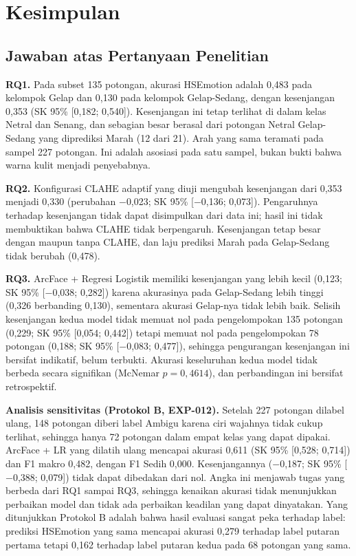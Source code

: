 \chapter{Kesimpulan}
\label{chap:conclusion}

\section{Jawaban atas Pertanyaan Penelitian}

\textbf{RQ1.} Pada subset 135 potongan, akurasi HSEmotion adalah 0,483 pada kelompok Gelap dan 0,130 pada kelompok Gelap-Sedang, dengan kesenjangan 0,353 (SK 95\% [0,182; 0,540]). Kesenjangan ini tetap terlihat di dalam kelas Netral dan Senang, dan sebagian besar berasal dari potongan Netral Gelap-Sedang yang diprediksi Marah (12 dari 21). Arah yang sama teramati pada sampel 227 potongan. Ini adalah asosiasi pada satu sampel, bukan bukti bahwa warna kulit menjadi penyebabnya.

\textbf{RQ2.} Konfigurasi CLAHE adaptif yang diuji mengubah kesenjangan dari 0,353 menjadi 0,330 (perubahan $-$0,023; SK 95\% [$-$0,136; 0,073]). Pengaruhnya terhadap kesenjangan tidak dapat disimpulkan dari data ini; hasil ini tidak membuktikan bahwa CLAHE tidak berpengaruh. Kesenjangan tetap besar dengan maupun tanpa CLAHE, dan laju prediksi Marah pada Gelap-Sedang tidak berubah (0,478).

\textbf{RQ3.} ArcFace + Regresi Logistik memiliki kesenjangan yang lebih kecil (0,123; SK 95\% [$-$0,038; 0,282]) karena akurasinya pada Gelap-Sedang lebih tinggi (0,326 berbanding 0,130), sementara akurasi Gelap-nya tidak lebih baik. Selisih kesenjangan kedua model tidak memuat nol pada pengelompokan 135 potongan (0,229; SK 95\% [0,054; 0,442]) tetapi memuat nol pada pengelompokan 78 potongan (0,188; SK 95\% [$-$0,083; 0,477]), sehingga pengurangan kesenjangan ini bersifat indikatif, belum terbukti. Akurasi keseluruhan kedua model tidak berbeda secara signifikan (McNemar $p = 0,4614$), dan perbandingan ini bersifat retrospektif.

\textbf{Analisis sensitivitas (Protokol B, EXP-012).} Setelah 227 potongan dilabel ulang, 148 potongan diberi label Ambigu karena ciri wajahnya tidak cukup terlihat, sehingga hanya 72 potongan dalam empat kelas yang dapat dipakai. ArcFace + LR yang dilatih ulang mencapai akurasi 0,611 (SK 95\% [0,528; 0,714]) dan F1 makro 0,482, dengan F1 Sedih 0,000. Kesenjangannya ($-$0,187; SK 95\% [$-$0,388; 0,079]) tidak dapat dibedakan dari nol. Angka ini menjawab tugas yang berbeda dari RQ1 sampai RQ3, sehingga kenaikan akurasi tidak menunjukkan perbaikan model dan tidak ada perbaikan keadilan yang dapat dinyatakan. Yang ditunjukkan Protokol B adalah bahwa hasil evaluasi sangat peka terhadap label: prediksi HSEmotion yang sama mencapai akurasi 0,279 terhadap label putaran pertama tetapi 0,162 terhadap label putaran kedua pada 68 potongan yang sama.

